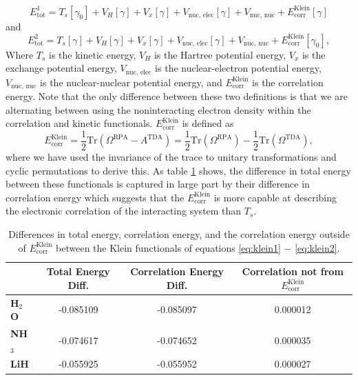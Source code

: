 \documentclass[12pt]{caltech_thesis}
\begin{document}
\begin{equation}
    E_{\text{tot}}^{\mathrm{1}} = T_s [\gamma _{0}] + V_H [\gamma ] + V_x [\gamma ] + V_{\text{nuc, elec}} [\gamma ] + V_{\text{nuc, nuc}} + E_{\text{corr}} ^{\text{Klein}}[\gamma ]
\label{eq:klein1}
\end{equation}
and
\begin{equation}
    E_{\text{tot}}^{\mathrm{2}} = T_s [\gamma ] + V_H [\gamma ] + V_x [\gamma ] + V_{\text{nuc, elec}} [\gamma ] + V_{\text{nuc, nuc}} + E_{\text{corr}} ^{\text{Klein}}[\gamma_0],
\label{eq:klein2}
\end{equation}
Where $T_s$ is the kinetic energy, $V_H$ is the Hartree potential energy, $V_x$ is the exchange potential energy, $V_{\text{nuc, elec}}$ is the nuclear-electron potential energy, $V_{\text{nuc, nuc}}$ is the nuclear-nuclear potential energy, and $E_{\text{corr}} ^{\text{Klein}}$ is the correlation energy. Note that the only difference between these two definitions is that we are alternating between using the noninteracting electron density within the correlation and kinetic functionals. $E_{\text{corr}} ^{\text{Klein}}$ is defined as
\begin{equation}
    E_{\text{corr}}^{\text{Klein}} = \frac{1}{2} \text{Tr} (\Omega ^{\text{RPA}} - A^{\text{TDA}})
    = \frac{1}{2} \text{Tr} (\Omega ^{\text{RPA}} ) - \frac{1}{2} \text{Tr} (\Omega ^{\text{TDA}}),
\end{equation}
where we have used the invariance of the trace to unitary transformations and cyclic permutations to derive this.
As table \ref{tab:klein} shows, the difference in total energy between these functionals is captured in large part by their difference in correlation energy which suggests that the $E_{\text{corr}} ^{\text{Klein}}$ is more capable at describing the electronic correlation of the interacting system than $T_s$.
\begin{table}[h!]
\centering
\begin{tabular}{lccc}
\toprule
& \textbf{Total Energy Diff.} & \textbf{Correlation Energy Diff.} & \textbf{Correlation not from $E_{\mathrm{corr}}^{\mathrm{Klein}}$} \\
\midrule
\textbf{H$_2$O} & -0.085109 & -0.085097 & 0.000012 \\
\textbf{NH$_3$} & -0.074617 & -0.074652 & 0.000035 \\
\textbf{LiH} & -0.055925 & -0.055952 & 0.000027 \\
\bottomrule
\end{tabular}
\caption{Differences in total energy, correlation energy, and the correlation energy outside of $E_{\mathrm{corr}}^{\mathrm{Klein}}$ between the Klein functionals of equations \ref{eq:klein1} $-$ \ref{eq:klein2}.}
\label{tab:klein}
\end{table}
\end{document}
